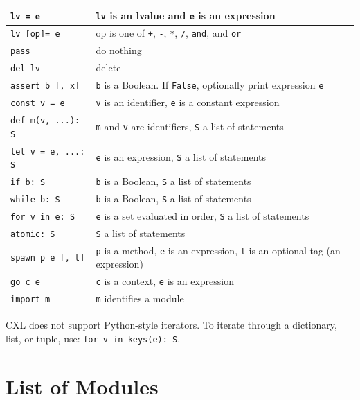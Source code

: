 \documentclass{report}
\begin{document}
\vspace{1em}
\begin{tabular}{|l|l|}
\hline
\texttt{lv = e} & \texttt{lv} is an lvalue and \texttt{e} is an expression\\
\hline
\texttt{lv [op]= e} & op is one of \texttt{+}, \texttt{-}, \texttt{*}, \texttt{/}, 
\texttt{and}, and \texttt{or}\\
\hline
\texttt{pass} & do nothing\\
\hline
\texttt{del lv} & delete\\
\hline
\texttt{assert b [, x]} & \texttt{b} is a Boolean.  If \texttt{False}, optionally print expression \texttt{e}\\
\hline
\texttt{const v = e} & \texttt{v} is an identifier, \texttt{e} is a constant expression\\
\hline
\texttt{def m(v, ...): S} & \texttt{m} and \texttt{v} are identifiers, \texttt{S} a list of statements\\
\hline
\texttt{let v = e, ...: S} & \texttt{e} is an expression, \texttt{S} a list of statements\\
\hline
\texttt{if b: S} & \texttt{b} is a Boolean, \texttt{S} a list of statements\\
\hline
\texttt{while b: S} & \texttt{b} is a Boolean, \texttt{S} a list of statements\\
\hline
\texttt{for v in e: S} & \texttt{e} is a set evaluated in order,
                            \texttt{S} a list of statements\\
\hline
\texttt{atomic: S} & \texttt{S} a list of statements\\
\hline
\texttt{spawn p e [, t]} & \texttt{p} is a method, \texttt{e} is an expression, \texttt{t} is an optional tag (an expression) \\
\hline
\texttt{go c e} & \texttt{c} is a context, \texttt{e} is an expression \\
\hline
\texttt{import m} & \texttt{m} identifies a module \\
\hline
\end{tabular}
\vspace{1em}

CXL does not support Python-style iterators.
To iterate through a dictionary, list, or tuple, use:
\texttt{for v in keys(e):~S}.

\chapter{List of Modules}
\label{ap:module}
\end{document}
